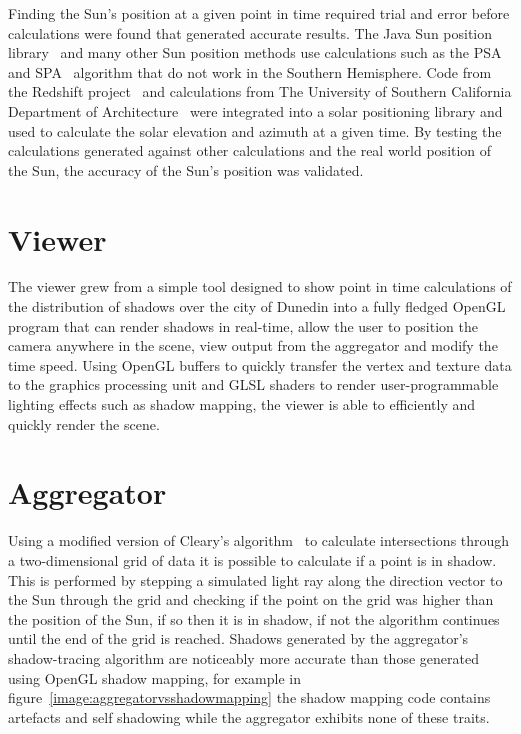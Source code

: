 \documentclass[12pt]{report}
\newcommand{\note}[1]{}
\newcommand{\notedme}[1]{}
\begin{document}
Finding the Sun's position at a given point in time required trial and error before calculations were found that generated accurate results. The Java Sun position library~\cite{javasunlib} and many other Sun position methods use calculations such as the PSA~\cite{psa} and SPA~\cite{spa} algorithm that do not work in the Southern Hemisphere\cite{southsun}. Code from the Redshift project~\cite{redshift} and calculations from The University of Southern California Department of Architecture~\cite{solarazi} were integrated into a solar positioning library and used to calculate the solar elevation and azimuth at a given time. By testing the calculations generated against other calculations and the real world position of the Sun, the accuracy of the Sun's position was validated.


\section{Viewer}\note{Should I change these headings?}\notedme{up to you, and what you think is most clear to readers}
The viewer grew from a simple tool designed to show point in time calculations of the distribution of shadows over the city of Dunedin into a fully fledged OpenGL program that can render shadows in real-time, allow the user to position the camera anywhere in the scene, view output from the aggregator and modify the time speed. Using OpenGL buffers to quickly transfer the vertex and texture data to the graphics processing unit and GLSL shaders to render user-programmable lighting effects such as shadow mapping, the viewer is able to efficiently and quickly render the scene.

\section{Aggregator}
Using a modified version of Cleary's algorithm~\cite{cleary} to calculate intersections through a two-dimensional grid of data it is possible to calculate if a point is in shadow. This is performed by stepping a simulated light ray along the direction vector to the Sun through the grid and checking if the point on the grid was higher than the position of the Sun, if so then it is in shadow, if not the algorithm continues until the end of the grid is reached. Shadows generated by the aggregator's shadow-tracing algorithm are noticeably more accurate than those generated using OpenGL shadow mapping, for example in figure~\ref{image:aggregatorvsshadowmapping} the shadow mapping code contains artefacts and self shadowing while the aggregator exhibits none of these traits.
\end{document}
